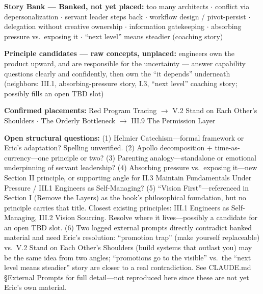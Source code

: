 \documentclass[11pt, letterpaper]{article}
\begin{document}
{\small\color{midgray}
\textbf{Story Bank --- Banked, not yet placed:}
too many architects $\cdot$
conflict via depersonalization $\cdot$
servant leader steps back $\cdot$
workflow design / pivot-persist $\cdot$
delegation without creative ownership $\cdot$
information gatekeeping $\cdot$
absorbing pressure vs.\ exposing it $\cdot$
``next level'' means steadier (coaching story)

\vspace{0.3em}
\textbf{Principle candidates --- raw concepts, unplaced:}
engineers own the product upward, and are responsible for the uncertainty ---
answer capability questions clearly and confidently, then own the ``it depends''
underneath
(neighbors: III.1, absorbing-pressure story, I.3, ``next level'' coaching story;
possibly fills an open TBD slot)

\vspace{0.3em}
\textbf{Confirmed placements:}
Red Program Tracing $\rightarrow$ V.2 Stand on Each Other's Shoulders $\cdot$
The Orderly Bottleneck $\rightarrow$ III.9 The Permission Layer

\vspace{0.5em}
\textbf{Open structural questions:}
(1) Helmier Catechism---formal framework or Eric's adaptation? Spelling unverified.
(2) Apollo decomposition + time-as-currency---one principle or two?
(3) Parenting analogy---standalone or emotional underpinning of servant leadership?
(4) Absorbing pressure vs.\ exposing it---new Section II principle, or supporting
    angle for II.3 Maintain Fundamentals Under Pressure / III.1 Engineers as
    Self-Managing?
(5) ``Vision First''---referenced in Section I (Remove the Layers) as the book's
    philosophical foundation, but no principle carries that title. Closest existing
    principles: III.1 Engineers as Self-Managing, III.2 Vision Sourcing. Resolve
    where it lives---possibly a candidate for an open TBD slot.
(6) Two logged external prompts directly contradict banked material and need
    Eric's resolution: ``promotion trap'' (make yourself replaceable) vs.\
    V.2 Stand on Each Other's Shoulders (build systems that outlast you) may be
    the same idea from two angles; ``promotions go to the visible'' vs.\ the
    ``next level means steadier'' story are closer to a real contradiction.
    See CLAUDE.md \S External Prompts for full detail---not reproduced here
    since these are not yet Eric's own material.
}
\end{document}
